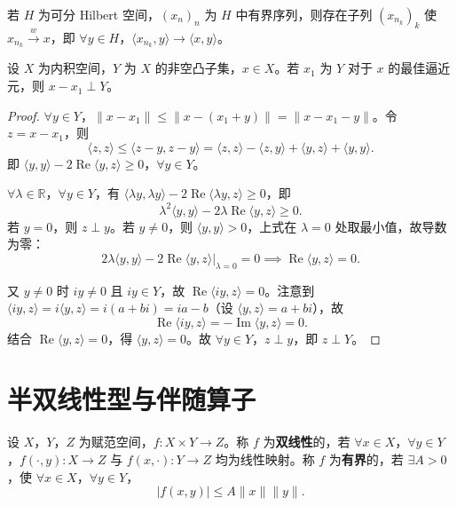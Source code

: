 \documentclass[lang=cn,a4paper,newtx,section]{elegantbook}
\begin{document}
\begin{corollary}
  若 $H$ 为可分 Hilbert 空间，$(x_n)_n$ 为 $H$ 中有界序列，则存在子列 $(x_{n_k})_k$ 使 $x_{n_k}\xrightarrow{w}x$，即 $\forall y\in H$，$\langle x_{n_k},y\rangle\to\langle x,y\rangle$。
\end{corollary}

\begin{theorem}
  设 $X$ 为内积空间，$Y$ 为 $X$ 的非空凸子集，$x\in X$。若 $x_1$ 为 $Y$ 对于 $x$ 的最佳逼近元，则 $x-x_1\perp Y$。
\end{theorem}

\begin{proof}
  $\forall y\in Y$，$\|x-x_1\|\leq\|x-(x_1+y)\|=\|x-x_1-y\|$。令 $z=x-x_1$，则
  \[
    \langle z,z\rangle\leq\langle z-y,z-y\rangle=\langle z,z\rangle-\langle z,y\rangle+\langle y,z\rangle+\langle y,y\rangle.
  \]
  即 $\langle y,y\rangle-2\operatorname{Re}\langle y,z\rangle\geq 0$，$\forall y\in Y$。

  $\forall\lambda\in\mathbb{R}$，$\forall y\in Y$，有 $\langle\lambda y,\lambda y\rangle-2\operatorname{Re}\langle\lambda y,z\rangle\geq 0$，即
  \[
    \lambda^2\langle y,y\rangle-2\lambda\operatorname{Re}\langle y,z\rangle\geq 0.
  \]
  若 $y=0$，则 $z\perp y$。若 $y\neq 0$，则 $\langle y,y\rangle>0$，上式在 $\lambda=0$ 处取最小值，故导数为零：
  \[
    2\lambda\langle y,y\rangle-2\operatorname{Re}\langle y,z\rangle\big|_{\lambda=0}=0\implies\operatorname{Re}\langle y,z\rangle=0.
  \]

  又 $y\neq 0$ 时 $iy\neq 0$ 且 $iy\in Y$，故 $\operatorname{Re}\langle iy,z\rangle=0$。注意到 $\langle iy,z\rangle=i\langle y,z\rangle=i(a+bi)=ia-b$（设 $\langle y,z\rangle=a+bi$），故
  \[
    \operatorname{Re}\langle iy,z\rangle=-\operatorname{Im}\langle y,z\rangle=0.
  \]
  结合 $\operatorname{Re}\langle y,z\rangle=0$，得 $\langle y,z\rangle=0$。故 $\forall y\in Y$，$z\perp y$，即 $z\perp Y$。
\end{proof}

\section{半双线性型与伴随算子}

\begin{definition}[双线性映射]
  设 $X$，$Y$，$Z$ 为赋范空间，$f:X\times Y\to Z$。称 $f$ 为\textbf{双线性}的，若 $\forall x\in X$，$\forall y\in Y$，$f(\cdot,y):X\to Z$ 与 $f(x,\cdot):Y\to Z$ 均为线性映射。称 $f$ 为\textbf{有界}的，若 $\exists A>0$，使 $\forall x\in X$，$\forall y\in Y$，
  \[
    |f(x,y)|\leq A\|x\|\|y\|.
  \]
\end{definition}
\end{document}
